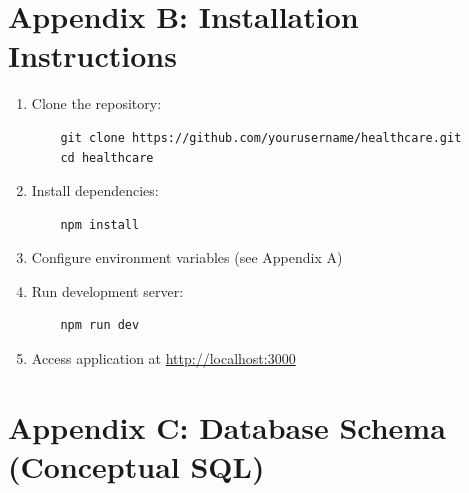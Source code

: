 \documentclass[11pt,a4paper]{article}
\begin{document}
\section{Appendix B: Installation Instructions}

\begin{enumerate}
    \item Clone the repository:
    \begin{verbatim}
    git clone https://github.com/yourusername/healthcare.git
    cd healthcare
    \end{verbatim}
    \item Install dependencies:
    \begin{verbatim}
    npm install
    \end{verbatim}
    \item Configure environment variables (see Appendix A)
    \item Run development server:
    \begin{verbatim}
    npm run dev
    \end{verbatim}
    \item Access application at \url{http://localhost:3000}
\end{enumerate}

\section{Appendix C: Database Schema (Conceptual SQL)}
\end{document}
